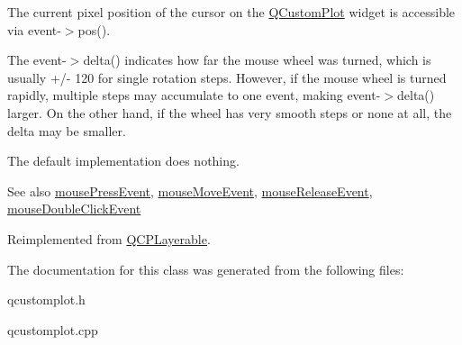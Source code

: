 The current pixel position of the cursor on the \hyperlink{classQCustomPlot}{Q\+Custom\+Plot} widget is accessible via {\ttfamily event-\/$>$pos()}.

The {\ttfamily event-\/$>$delta()} indicates how far the mouse wheel was turned, which is usually +/-\/ 120 for single rotation steps. However, if the mouse wheel is turned rapidly, multiple steps may accumulate to one event, making {\ttfamily event-\/$>$delta()} larger. On the other hand, if the wheel has very smooth steps or none at all, the delta may be smaller.

The default implementation does nothing.

\begin{DoxySeeAlso}{See also}
\hyperlink{classQCPColorScale_a91f633b97ffcd57fdf8cd814974c20e6}{mouse\+Press\+Event}, \hyperlink{classQCPColorScale_a3b2bd79725aefaf2630fc76e90939442}{mouse\+Move\+Event}, \hyperlink{classQCPColorScale_a6a35dd39ab4e5cb2d7b29ebb4d5b61b0}{mouse\+Release\+Event}, \hyperlink{classQCPLayerable_a4171e2e823aca242dd0279f00ed2de81}{mouse\+Double\+Click\+Event} 
\end{DoxySeeAlso}


Reimplemented from \hyperlink{classQCPLayerable_a47dfd7b8fd99c08ca54e09c362b6f022}{Q\+C\+P\+Layerable}.



The documentation for this class was generated from the following files\+:\begin{DoxyCompactItemize}
\item 
qcustomplot.\+h\item 
qcustomplot.\+cpp\end{DoxyCompactItemize}
